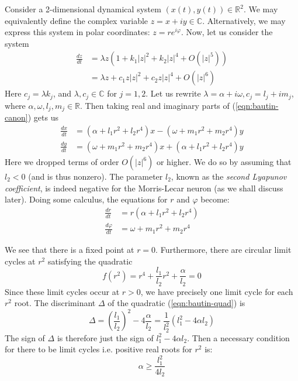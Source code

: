 \documentclass[letterpaper,12pt]{article}
\numberwithin{table}{section}
\numberwithin{figure}{section}
\numberwithin{equation}{section}
\newcommand*{\deriv}[2]{\frac{d #1}{d #2}}
\newcommand*{\abs}[1]{\left| #1 \right|}
\begin{document}
\begin{flushleft}
    Consider a 2-dimensional dynamical system $(x(t), y(t)) \in \mathbb{R}^2$. We may equivalently define the complex variable $z = x + iy \in \mathbb{C}$. Alternatively, we may express this system in polar coordinates: $z = re^{i\varphi}$. Now, let us consider the system
    \begin{align}
        \deriv{z}{t} &= \lambda z\left(1 + k_1\abs{z}^2 + k_2\abs{z}^4 + O\left(\abs{z}^5\right)\right) \\
        \label{eqn:bautin-canon}
        &= \lambda z + c_1 z\abs{z}^2 + c_2 z\abs{z}^4 + O\left(\abs{z}^6\right)
    \end{align}
    Here $c_j = \lambda k_j$, and $\lambda, c_j \in \mathbb{C}$ for $j = 1, 2$. Let us rewrite $\lambda = \alpha + i\omega, c_j = l_j + im_j$, where $\alpha, \omega, l_j, m_j \in \mathbb{R}$. Then taking real and imaginary parts of (\ref{eqn:bautin-canon}) gets us
    \begin{align}
        \deriv{x}{t} &= (\alpha + l_1 r^2 + l_2 r^4)x - (\omega + m_1 r^2 + m_2 r^4)y \\
        \deriv{y}{t} &= (\omega + m_1 r^2 + m_2 r^4)x + (\alpha + l_1 r^2 + l_2 r^4)y
    \end{align}
    Here we dropped terms of order $O\left(\abs{z}^6\right)$ or higher. We do so by assuming that $l_2 < 0$ (and is thus nonzero). The parameter $l_2$, known as the \textit{second Lyapunov coefficient}, is indeed negative for the Morris-Lecar neuron (as we shall discuss later). Doing some calculus, the equations for $r$ and $\varphi$ become:
    \begin{align}
        \deriv{r}{t} &= r(\alpha + l_1 r^2 + l_2 r^4) \\
        \deriv{\varphi}{t} &= \omega + m_1 r^2 + m_2 r^4
    \end{align}

    We see that there is a fixed point at $r = 0$. Furthermore, there are circular limit cycles at $r^2$ satisfying the quadratic
    \begin{equation}
        \label{eqn:bautin-quad}
        f(r^2) = r^4 + \frac{l_1}{l_2} r^2 + \frac{\alpha}{l_2} = 0
    \end{equation}
    Since these limit cycles occur at $r > 0$, we have precisely one limit cycle for each $r^2$ root. The discriminant $\Delta$ of the quadratic (\ref{eqn:bautin-quad}) is
    \begin{equation}
        \Delta = \left(\frac{l_1}{l_2}\right)^2 - 4\frac{\alpha}{l_2} = \frac{1}{l_2^2} \left(l_1^2 - 4\alpha l_2\right)
    \end{equation}
    The sign of $\Delta$ is therefore just the sign of $l_1^2 - 4\alpha l_2$. Then a necessary condition for there to be limit cycles i.e. positive real roots for $r^2$ is:
    \begin{equation}
        \alpha \geq \frac{l_1^2}{4l_2}
    \end{equation}


\end{flushleft}
\end{document}
